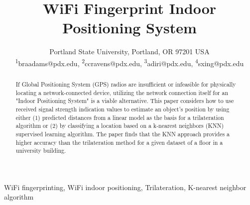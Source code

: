 \documentclass[12pt, conference]{IEEEtran}
\begin{document}
\title{WiFi Fingerprint Indoor Positioning System}

\author{
  {Portland State University, Portland, OR 97201 USA} \\
  \textsuperscript{1}braadams@pdx.edu, \textsuperscript{2}ccravens@pdx.edu, \textsuperscript{3}adiri@pdx.edu, \textsuperscript{4}sxing@pdx.edu
}

\maketitle



\begin{abstract}
If Global Positioning System (GPS) radios are insufficient or infeasible for physically locating a network-connected device, utilizing the network connection itself for an "Indoor Positioning System" is a viable alternative. This paper considers how to use received signal strength indication values to estimate an object's position by using either (1) predicted distances from a linear model as the basis for a trilateration algorithm or (2) by classifying a location based on a k-nearest neighbors (KNN) supervised learning algorithm. The paper finds that the KNN approach provides a higher accuracy than the trilateration method for a given dataset of a floor in a university building.
\end{abstract}

\begin{IEEEkeywords}
  WiFi fingerprinting, WiFi indoor positioning, Trilateration, K-nearest neighbor algorithm
\end{IEEEkeywords}


\end{document}
